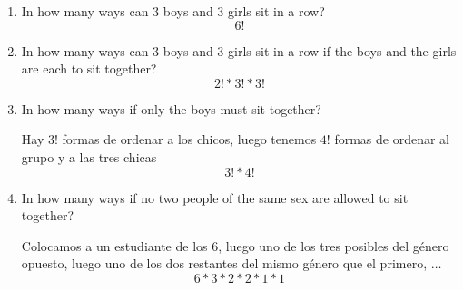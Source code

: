 \item 
\begin{enumerate}
    \item In how many ways can 3 boys and 3 girls sit in a row?
    \[ 6! \]
    
    \item In how many ways can 3 boys and 3 girls sit in a row if the boys and the girls are each to sit together?
    \[ 2! * 3! * 3! \]

    \item In how many ways if only the boys must sit together?

    Hay $3!$ formas de ordenar a los chicos, luego tenemos $4!$ formas de ordenar al grupo y a las tres chicas
    \[ 3! * 4! \]

    \item In how many ways if no two people of the same sex are allowed to sit together?

    Colocamos a un estudiante de los 6, luego uno de los tres posibles del género opuesto, luego uno de los dos restantes del mismo género que el primero, $\dots$
    \[ 6 * 3 * 2 * 2 * 1 * 1 \]

    
    
\end{enumerate}